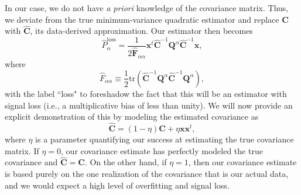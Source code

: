 \documentclass[preprint2,numberedappendix,tighten]{aastex6}  %
\newcommand{\x}{\mathbf{x}}
\newcommand{\C}{\mathbf{C}}
\newcommand{\Chat}{\mathbf{\widehat{C}}}
\newcommand{\F}{\mathbf{F}}
\newcommand{\Q}{\mathbf{Q}}
\begin{document}
In our case, we do not have \emph{a priori} knowledge of the covariance matrix. Thus, we deviate from the true minimum-variance quadratic estimator and replace $\C$ with $\Chat$, its data-derived approximation. Our estimator then becomes
\begin{equation}
\label{eq:phatloss}
\widehat{P}_\alpha^\textrm{loss} = \frac{1} {2 \widehat{\F}_{\alpha \alpha} }\x^t \Chat^{-1} \Q^{\alpha} \Chat^{-1} \x,
\end{equation}
where
\begin{equation}
\widehat{F}_{\alpha \alpha} \equiv \frac{1}{2} \textrm{tr} \left( \Chat^{-1} \Q^\alpha \Chat^{-1} \Q^\alpha \right),
\end{equation}
with the label ``loss" to foreshadow the fact that this will be an estimator with signal loss (i.e., a multiplicative bias of less than unity). We will now provide an explicit demonstration of this by modeling the estimated covariance as
\begin{equation}
\label{eq:ChatDef}
\Chat = (1-\eta) \C + \eta \x \x^t,
\end{equation}
where $\eta$ is a parameter quantifying our success at estimating the true covariance matrix. If $\eta = 0$, our covariance estimate has perfectly modeled the true covariance and $\Chat = \C$. On the other hand, if $\eta =1$, then our covariance estimate is based purely on the one realization of the covariance that is our actual data, and we would expect a high level of overfitting and signal loss.
\end{document}
